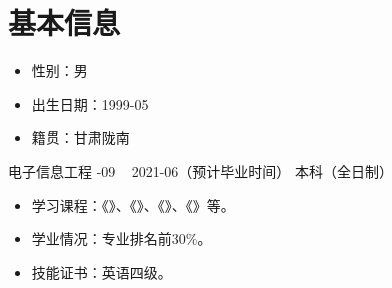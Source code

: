 \section{\kaishu 基本信息}
\begin{itemize}
    \item {\kaishu 性别：男}
    \item {\kaishu 出生日期：1999-05}
    \item {\kaishu 籍贯：甘肃陇南} 
\end{itemize}
    
    {\kaishu 电子信息工程}
    {-09 ~ 2021-06（预计毕业时间）}
    {本科（全日制）}

\begin{itemize}
	\item  {\kaishu 学习课程：《》、《》、《》、《》等。}
	\item {\kaishu 学业情况：专业排名前30\%。}
	\item {\kaishu 技能证书：英语四级。}
\end{itemize}